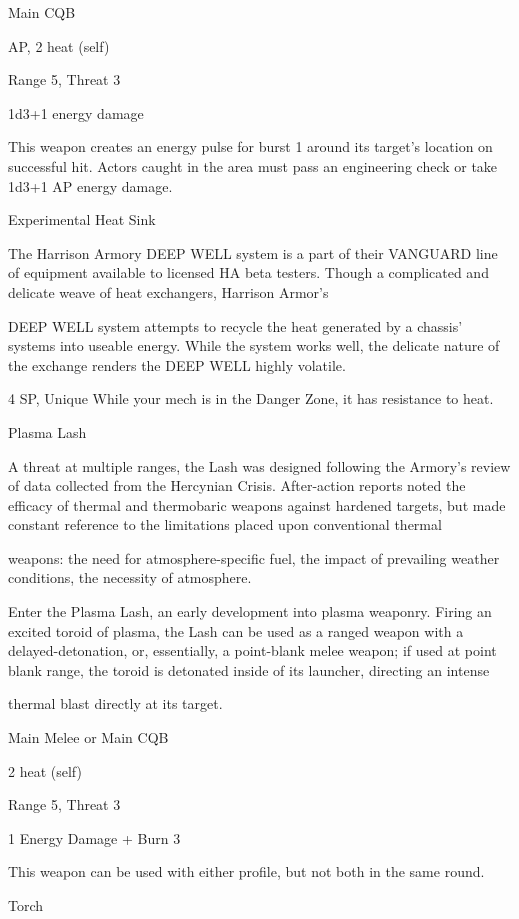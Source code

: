 Main CQB

AP, 2 heat (self)

Range 5, Threat 3

1d3+1 energy damage

This weapon creates an energy pulse for burst 1 around its target’s location on successful hit.
Actors caught in the area must pass an engineering check or take 1d3+1 AP energy damage.


Experimental Heat Sink

The Harrison Armory DEEP WELL system is a part of their VANGUARD line of equipment available to
licensed HA beta testers. Though a complicated and delicate weave of heat exchangers, Harrison Armor’s

DEEP WELL system attempts to recycle the heat generated by a chassis’ systems into useable energy.
While the system works well, the delicate nature of the exchange renders the DEEP WELL highly volatile.

4 SP, Unique
While your mech is in the Danger Zone, it has resistance to heat.


Plasma Lash

A threat at multiple ranges, the Lash was designed following the Armory’s review of data collected from the
Hercynian Crisis. After-action reports noted the efficacy of thermal and thermobaric weapons against
hardened targets, but made constant reference to the limitations placed upon conventional thermal

weapons: the need for atmosphere-specific fuel, the impact of prevailing weather conditions, the necessity
of atmosphere.

Enter the Plasma Lash, an early development into plasma weaponry. Firing an excited toroid of plasma, the
Lash can be used as a ranged weapon with a delayed-detonation, or, essentially, a point-blank melee
weapon; if used at point blank range, the toroid is detonated inside of its launcher, directing an intense

thermal blast directly at its target.

Main Melee or Main CQB

2 heat (self)

Range 5, Threat 3

1 Energy Damage + Burn 3





This weapon can be used with either profile, but not both in the same round.


Torch


